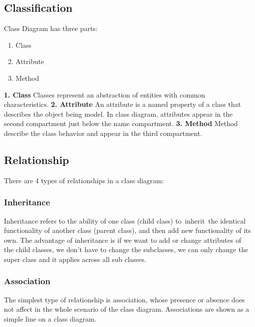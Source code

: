 \noindent 

\subsection{Classification}
\noindent Class Diagram has three parts:
\begin{enumerate}
\item  Class
\item  Attribute
\item  Method
\end{enumerate}

\noindent 
\noindent  \textbf{1. Class}
\noindent Classes represent an abstraction of entities with common characteristics.
\noindent  \textbf{2. Attribute}
\noindent An attribute is a named property of a class that describes the object being model. In class diagram, attributes appear in the second compartment just below the name compartment.
\noindent  \textbf{3. Method}
\noindent Method describe the class behavior and appear in the third compartment.


\noindent 
\subsection{Relationship}

\noindent There are 4 types of relationships in a class diagram:

\noindent 
\subsubsection{ Inheritance}

\noindent Inheritance refers to the ability of one class (child class) to~inherit~the identical functionality of another class (parent class), and then add new functionality of its own. The advantage of inheritance is if we want to add or change attributes of the child classes, we don't have to change the subclasses, we can only change the super class and it applies across all sub classes.


\noindent 
\subsubsection{ Association}

\noindent The simplest type of relationship is association, whose presence or absence does not affect in the whole scenario of the class diagram. Associations are shown as a simple line on a class diagram.


